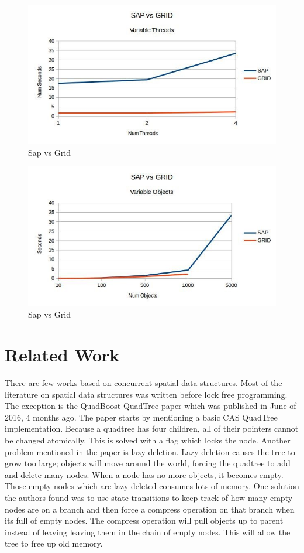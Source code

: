 \documentclass[conference]{IEEEtran}
\begin{document}
\begin{figure}[!h]
\centering
\includegraphics[scale=0.5]{sap_grid}
\caption{Sap vs Grid}
\label{fig_sim}
\end{figure}

\begin{figure}[!h]
\centering
\includegraphics[scale=0.5]{sap_grid2}
\caption{Sap vs Grid}
\label{fig_sim}
\end{figure}

\section{Related Work}
There are few works based on concurrent spatial data structures. Most of the literature on spatial data structures was written before lock free programming. The exception is the QuadBoost QuadTree paper which was published in June of 2016, 4 months ago. The paper starts by mentioning a basic CAS QuadTree implementation. Because a quadtree has four children, all of their pointers cannot be changed atomically. This is solved with a flag which locks the node. Another problem mentioned in the paper is lazy deletion. Lazy deletion causes the tree to grow too large; objects will move around the world, forcing the quadtree to add and delete many nodes. When a node has no more objects, it becomes empty. Those empty nodes which are lazy deleted consumes lots of memory. One solution the authors found was to use state transitions to keep track of how many empty nodes are on a branch and then force a compress operation on that branch when it\textquotesingle s full of empty nodes. The compress operation will pull objects up to parent instead of leaving leaving them in the chain of empty nodes. This will allow the tree to free up old memory.
\end{document}
